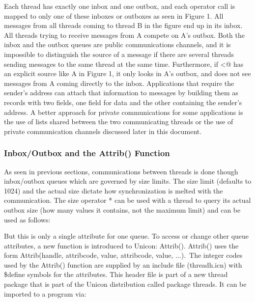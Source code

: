 Each thread has exactly one inbox and one outbox, and each operator call
is mapped to only one of these inboxes or outboxes as seen in Figure 1.
All messages from all threads coming to thread B in the figure end up
in its inbox. All threads trying to receive messages from A compete on
A{\textquoteright}s outbox. Both the inbox and the outbox queues are
public communications channels, and it is impossible to distinguish the
source of a message if there are several threads sending messages to
the same thread at the same time. Furthermore, if
\textsf{{\textless}@} has an explicit source like A in
Figure 1, it only looks in A{\textquoteright}s outbox, and does not see
messages from A coming directly to the inbox. Applications that require
the sender{\textquoteright}s address can attach that information to
messages by building them as records with two fields, one field for
data and the other containing the sender{\textquoteright}s address. A
better approach for private communications for some applications is the
use of lists shared between the two communicating threads or the use of
private communication channels discussed later in this document. 

\subsubsection[Inbox/Outbox and the Attrib() Function ]{Inbox/Outbox and
the \textsf{Attrib()} Function }

As seen in previous sections, communications between threads is done
though inbox/outbox queues which are governed by size limits. The size
limit (defaults to 1024) and the actual size dictate how synchronization
is melted with the communication. The size operator * can be used with
a thread to query its actual outbox size (how many values it contains,
not the maximum limit) and can be used as follows:


But this is only a single attribute for one queue. To access or change
other queue attributes, a new function is introduced to Unicon:
\textsf{Attrib()}. \textsf{Attrib()}
uses the form \textsf{Attrib(handle, attribcode, value,
attribcode, value, ...)}.~The integer codes used by the
\textsf{Attrib()} function are supplied by an include
file (\textsf{threadh.icn}) with
\textsf{\$define} symbols for the attributes. This
header file is part of a new thread package that is part of the Unicon
distribution called package \textsf{threads}. It can be
imported to a program via:

